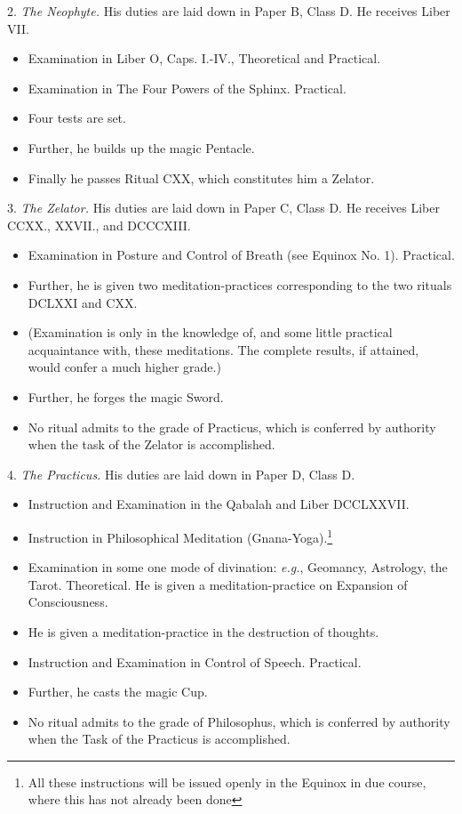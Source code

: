 2. \textit{The Neophyte.} His duties are laid down in Paper B, Class D. He receives Liber VII.
\begin{itemize}
\item Examination in Liber O, Caps. I.-IV., Theoretical and Practical.
\item Examination in The Four Powers of the Sphinx. Practical.
\item Four tests are set.
\item Further, he builds up the magic Pentacle.
\item Finally he passes Ritual CXX, which constitutes him a Zelator.
\end{itemize}

3. \textit{The Zelator.} His duties are laid down in Paper C, Class D. He receives Liber CCXX., XXVII., and DCCCXIII.
\begin{itemize}
\item Examination in Posture and Control of Breath (see Equinox No. 1). Practical.
\item Further, he is given two meditation-practices corresponding to the two rituals DCLXXI and CXX.
\item (Examination is only in the knowledge of, and some little practical acquaintance with, these meditations. The complete results, if attained, would confer a much higher grade.)
\item Further, he forges the magic Sword.
\item No ritual admits to the grade of Practicus, which is conferred by authority when the task of the Zelator is accomplished.
\end{itemize}

4. \textit{The Practicus.} His duties are laid down in Paper D, Class D.
\begin{itemize}
\item Instruction and Examination in the Qabalah and Liber DCCLXXVII.
\item Instruction in Philosophical Meditation (Gnana-Yoga).\footnote{All these instructions will be issued openly in the Equinox in due course, where this has not already been done}
\item Examination in some one mode of divination: \textit{e.g.}, Geomancy, Astrology, the Tarot. Theoretical. He is given a meditation-practice on Expansion of Consciousness.
\item He is given a meditation-practice in the destruction of thoughts.
\item Instruction and Examination in Control of Speech. Practical.
\item Further, he casts the magic Cup.
\item No ritual admits to the grade of Philosophus, which is conferred by authority when the Task of the Practicus is accomplished.
\end{itemize}

